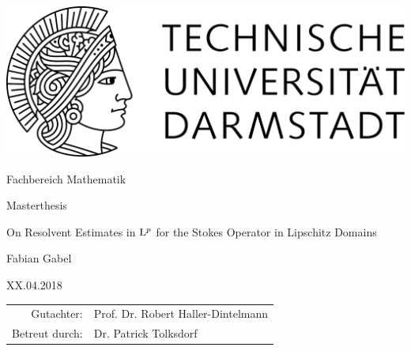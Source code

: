 \begin{titlepage}
  \begin{center}
    \includegraphics[width=0.5\linewidth]{TU_Darmstadt_Logo.pdf}
    \vfill
    
    \large{Fachbereich Mathematik}
    \vfill
    
    \large{Masterthesis}
    \vfill

    \huge{On Resolvent Estimates in $\mathrm{L}^p$ for the Stokes Operator in Lipschitz Domains}
    \vfill
    
		\large
    Fabian Gabel

    \large XX.04.2018
    \vfill
\begin{tabular}{rl}
    Gutachter:& Prof. Dr. Robert Haller-Dintelmann
    \\
    Betreut durch:& Dr. Patrick Tolksdorf
\end{tabular}
  \end{center}
\end{titlepage}
